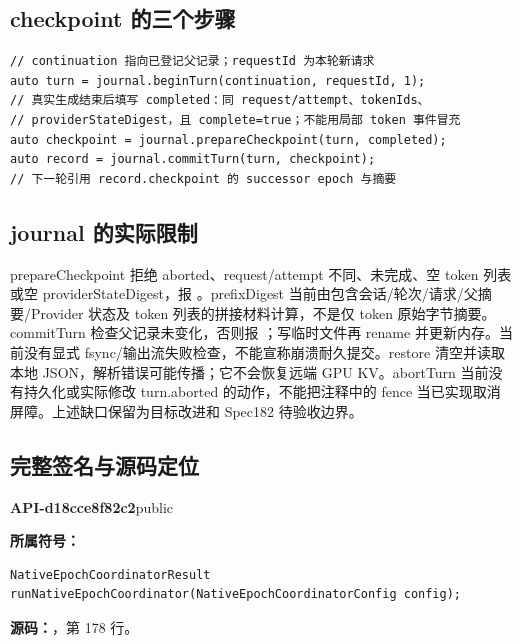 \subsection{checkpoint 的三个步骤}

\begin{Verbatim}[fontsize=\footnotesize,breaklines,breakanywhere]
// continuation 指向已登记父记录；requestId 为本轮新请求
auto turn = journal.beginTurn(continuation, requestId, 1);
// 真实生成结束后填写 completed：同 request/attempt、tokenIds、
// providerStateDigest，且 complete=true；不能用局部 token 事件冒充
auto checkpoint = journal.prepareCheckpoint(turn, completed);
auto record = journal.commitTurn(turn, checkpoint);
// 下一轮引用 record.checkpoint 的 successor epoch 与摘要
\end{Verbatim}

\subsection{journal 的实际限制}
prepareCheckpoint 拒绝 aborted、request/attempt 不同、未完成、空 token 列表或空 providerStateDigest，报 。prefixDigest 当前由包含会话/轮次/请求/父摘要/Provider 状态及 token 列表的拼接材料计算，不是仅 token 原始字节摘要。commitTurn 检查父记录未变化，否则报 ；写临时文件再 rename 并更新内存。当前没有显式 fsync/输出流失败检查，不能宣称崩溃耐久提交。restore 清空并读取本地 JSON，解析错误可能传播；它不会恢复远端 GPU KV。abortTurn 当前没有持久化或实际修改 turn.aborted 的动作，不能把注释中的 fence 当已实现取消屏障。上述缺口保留为目标改进和 Spec182 待验收边界。

\subsection{完整签名与源码定位}

\textbf{API-d18cce8f82c2}\quad public\par
\textbf{所属符号：}\par
\begin{Verbatim}[fontsize=\footnotesize,breaklines,breakanywhere]
NativeEpochCoordinatorResult
runNativeEpochCoordinator(NativeEpochCoordinatorConfig config);
\end{Verbatim}
\textbf{源码：}，第 178 行。\par

